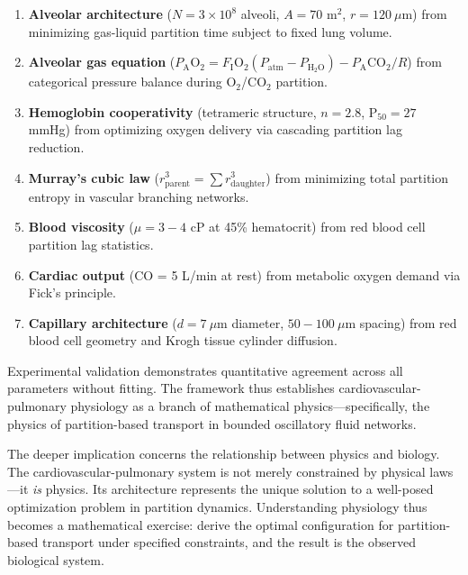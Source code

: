 \documentclass[12pt,a4paper]{article}
\theoremstyle{remark}
\begin{document}
\begin{enumerate}
\item \textbf{Alveolar architecture} ($N = 3 \times 10^{8}$ alveoli, $A = 70$ m$^{2}$, $r = 120~\mu$m) from minimizing gas-liquid partition time subject to fixed lung volume.

\item \textbf{Alveolar gas equation} ($P_{\mathrm{A}}\mathrm{O}_{2} = F_{\mathrm{I}}\mathrm{O}_{2}(P_{\mathrm{atm}} - P_{\mathrm{H}_{2}\mathrm{O}}) - P_{\mathrm{A}}\mathrm{CO}_{2}/R$) from categorical pressure balance during O$_{2}$/CO$_{2}$ partition.

\item \textbf{Hemoglobin cooperativity} (tetrameric structure, $n = 2.8$, P$_{50} = 27$ mmHg) from optimizing oxygen delivery via cascading partition lag reduction.

\item \textbf{Murray's cubic law} ($r_{\mathrm{parent}}^{3} = \sum r_{\mathrm{daughter}}^{3}$) from minimizing total partition entropy in vascular branching networks.

\item \textbf{Blood viscosity} ($\mu = 3-4$ cP at 45\% hematocrit) from red blood cell partition lag statistics.

\item \textbf{Cardiac output} (CO = 5 L/min at rest) from metabolic oxygen demand via Fick's principle.

\item \textbf{Capillary architecture} ($d = 7~\mu$m diameter, $50-100~\mu$m spacing) from red blood cell geometry and Krogh tissue cylinder diffusion.
\end{enumerate}

Experimental validation demonstrates quantitative agreement across all parameters without fitting. The framework thus establishes cardiovascular-pulmonary physiology as a branch of mathematical physics—specifically, the physics of partition-based transport in bounded oscillatory fluid networks.

The deeper implication concerns the relationship between physics and biology. The cardiovascular-pulmonary system is not merely constrained by physical laws—it \textit{is} physics. Its architecture represents the unique solution to a well-posed optimization problem in partition dynamics. Understanding physiology thus becomes a mathematical exercise: derive the optimal configuration for partition-based transport under specified constraints, and the result is the observed biological system.
\end{document}

